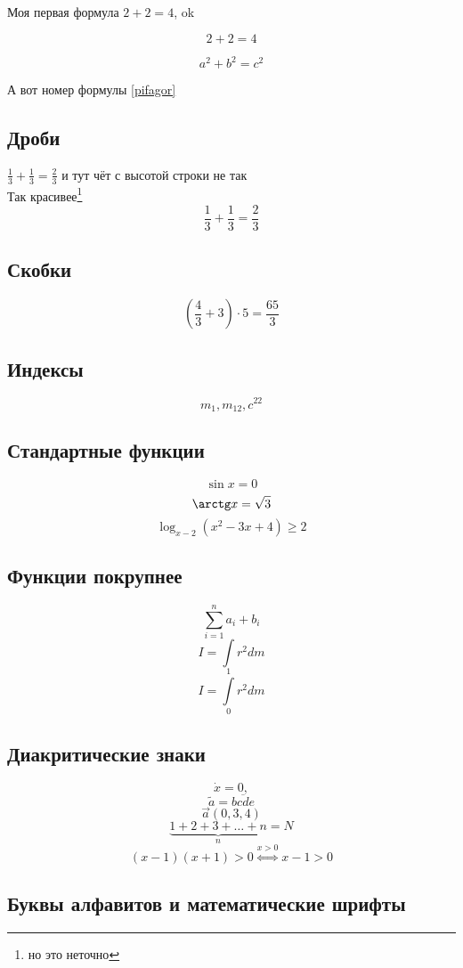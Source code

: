\documentclass[12pt]{article}
\begin{document}
Моя первая формула $2+2=4$, ok

\[2+2=4\] %

\begin{equation}\label{pifagor} 
a^2+b^2=c^2   %
\end{equation}

А вот номер формулы \eqref{pifagor}

\subsection{Дроби} %

$\frac{1}{3} + \frac{1}{3} = \frac{2}{3}$ и тут чёт с высотой строки не так\\
Так красивее\footnote{но это неточно}
\[\frac{1}{3} + \frac{1}{3} = \frac{2}{3}\] 

\subsection{Скобки}

\[\left(\frac{4}{3} + 3\right)\cdot 5=\frac{65}{3}\] %

\subsection{Индексы}
\[m_1, m_{12}, c^{22}\]

\subsection{Стандартные функции}
\[\sin x=0\]
\[\arctg x=\sqrt{3}\]
\[\log_{x-2}{(x^2-3x+4)} \geqslant 2\]

\subsection{Функции покрупнее}
\[\sum_{i=1}^{n}a_i+b_i\]
\[I = \int r^2dm\]
\[I = \int\limits_{0}^{1} r^2dm\]

\subsection{Диакритические знаки}

\[\dot{x} = 0,\]
\[\tilde{a}=\overline{bcde}\]
\[\overrightarrow{a}(0,3,4)\]
\[\underbrace{1+2+3+\dots+n}_{n}=N\]
\[(x-1)(x+1)>0 \stackrel{x>0}\Longleftrightarrow x-1>0\]

\subsection{Буквы алфавитов и математические шрифты}
\end{document}
